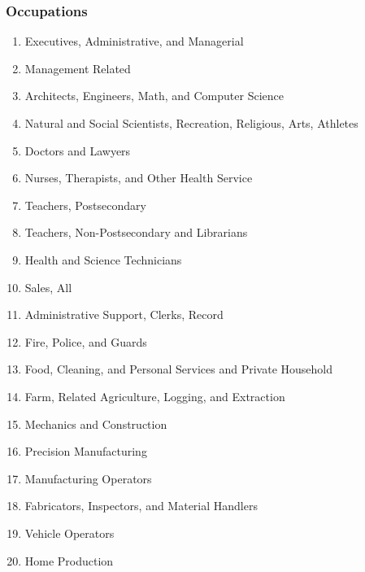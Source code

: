 \documentclass[11pt]{beamer}
\begin{document}
\begin{frame}
	\frametitle{Occupations} 
	\label{occupations}
 \scriptsize
	\begin{enumerate}
\item Executives, Administrative, and Managerial
\vspace{-0.2cm}
\item Management Related
\vspace{-0.2cm}
\item Architects, Engineers, Math, and Computer Science
\vspace{-0.2cm}
\item Natural and Social Scientists, Recreation, Religious, Arts, Athletes
\vspace{-0.2cm}
\item Doctors and Lawyers
\vspace{-0.2cm}
\item Nurses, Therapists, and Other Health Service
\vspace{-0.2cm}
\item Teachers, Postsecondary
\vspace{-0.2cm}
\item Teachers, Non-Postsecondary and Librarians
\vspace{-0.2cm}
\item Health and Science Technicians
\vspace{-0.2cm}
\item Sales, All
\vspace{-0.2cm}
\item Administrative Support, Clerks, Record
\vspace{-0.2cm}
\item Fire, Police, and Guards
\vspace{-0.2cm}
\item Food, Cleaning, and Personal Services and Private Household
\vspace{-0.2cm}
\item Farm, Related Agriculture, Logging, and Extraction
\vspace{-0.2cm}
\item Mechanics and Construction
\vspace{-0.2cm}
\item Precision Manufacturing
\vspace{-0.2cm}
\item Manufacturing Operators
\vspace{-0.2cm}
\item Fabricators, Inspectors, and Material Handlers
\vspace{-0.2cm}
\item Vehicle Operators
\vspace{-0.2cm}
\item Home Production 
	\end{enumerate}
 
	\hyperlink{barriers}{}
\end{frame}
\end{document}
